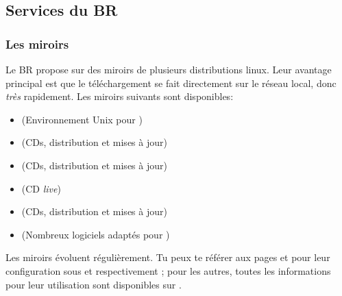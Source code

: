 \subsection{Services du BR}


\subsubsection{Les miroirs}
Le BR propose sur  des miroirs de plusieurs distributions linux. Leur avantage principal est que le téléchargement se fait directement sur le réseau local, donc \emph{très} rapidement.
Les miroirs suivants sont disponibles:

\begin{itemize}
\item {} (Environnement Unix pour )
\item {} (CDs, distribution et mises à jour)
\item {} (CDs, distribution et mises à jour)
\item {} (CD \emph{live})
\item {} (CDs, distribution et mises à jour)
\item {} (Nombreux logiciels  adaptés pour )
\end{itemize}


Les miroirs évoluent régulièrement. Tu peux te référer aux pages \pageref{gentoo_mirror} et \pageref{ubuntu_mirror} pour leur configuration sous  et  respectivement ; pour les autres, toutes les informations pour leur utilisation sont disponibles sur .
